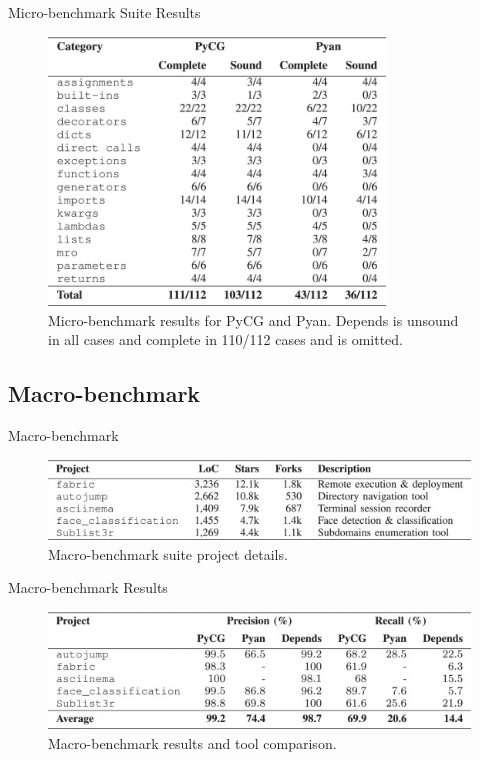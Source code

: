 \documentclass[9pt, xcolor=table]{beamer}
\begin{document}
\begin{frame}{Micro-benchmark Suite Results}
	\begin{figure}[htp]
		\centering
		\includegraphics[width=0.8\textwidth,height=0.6\paperheight]{Micro-Benchmark_Results.jpg}
		\caption{Micro-benchmark results for PyCG and Pyan.
		Depends is unsound in all cases and complete in 110/112 cases
		and is omitted.}
		\label{fig:micro_benchmark_results}
	\end{figure}
\end{frame}
%
\subsection{Macro-benchmark}
\begin{frame}{Macro-benchmark}
	\begin{figure}[htp]
		\centering
		\includegraphics[width=\textwidth,height=0.65\paperheight]{Macro-Benchmark.jpg}
		\caption{Macro-benchmark suite project details.}
		\label{fig:macro_benchmark}
	\end{figure}
\end{frame}
%
\begin{frame}{Macro-benchmark Results}
	\begin{figure}
		\centering
		\includegraphics[width=\textwidth,height=0.65\paperheight]{Macro-Benchmark_Results.jpg}
		\caption{Macro-benchmark results and tool comparison.}
		\label{fig:macro_benchmark_results}
	\end{figure}
\end{frame}
%
\end{document}
